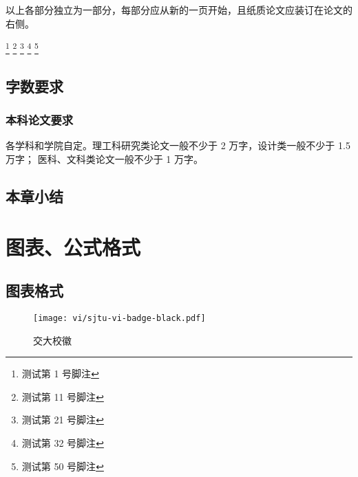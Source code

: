 以上各部分独立为一部分，每部分应从新的一页开始，且纸质论文应装订在论文的右侧。

\footnote[1]{测试第 1 号脚注}
\footnote[11]{测试第 11 号脚注}
\footnote[21]{测试第 21 号脚注}
\footnote[32]{测试第 32 号脚注}
\footnote[50]{测试第 50 号脚注}

\section{字数要求}

\subsection{本科论文要求}

各学科和学院自定。理工科研究类论文一般不少于 2 万字，设计类一般不少于 1.5 万字；
医科、文科类论文一般不少于 1 万字。

\section{本章小结}

\zhlipsum[5]


\chapter{图表、公式格式}

\section{图表格式}

\begin{figure}[ht]
  \centering
  \texttt{[image: vi/sjtu-vi-badge-black.pdf]}
  \caption{交大校徽}
  \label{fig:badge}
\end{figure}

